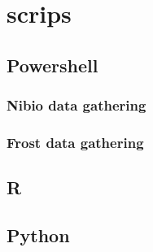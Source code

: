 \section{scrips}\label{apx:code}

\subsection{Powershell}\label{apx:code:datacollect}

\subsubsection{Nibio data gathering}

\subsubsection{Frost data gathering}

%

\subsection{R}\label{apx:code:dataanal}



\subsection{Python}

\label{apx:code:datamod}